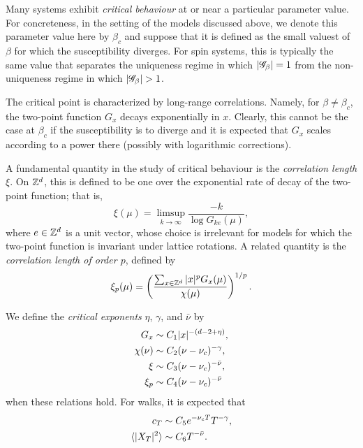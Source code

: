 Many systems exhibit \emph{critical behaviour} at or near a particular parameter value. For concreteness, in the setting of the models discussed above, we denote this parameter value here by $\beta_c$ and suppose that it is defined as the small valuest of $\beta$ for which the susceptibility diverges. For spin systems, this is typically the same value that separates the uniqueness regime in which $|\mathscr{G}_\beta| = 1$ from the non-uniqueness regime in which
$|\mathscr{G}_\beta| > 1$.

The critical point is characterized by long-range correlations. Namely, for
$\beta \ne \beta_c$, the two-point function $G_x$ decays exponentially in $x$. Clearly, this cannot be the case at $\beta_c$ if the susceptibility is to diverge and it is expected that $G_x$ scales according to a power there 
(possibly with logarithmic corrections).

A fundamental quantity in the study of critical behaviour is the
\emph{correlation length} $\xi$. On ${ {{\mathbb Z}}^d }$, this is defined to be one over the exponential rate of decay of the two-point function; that is,
\begin{equation}
\xi(\mu) = \limsup_{k\to\infty} \frac{-k}{\log G_{ke}(\mu)},
\end{equation}
where $e \in { {{\mathbb Z}}^d }$ is a unit vector, whose choice is irrelevant for models for which the two-point function is invariant under lattice rotations.
A related quantity is the \emph{correlation length of order $p$}, defined by
\begin{equation}
\xi_p(\mu) = \left(\frac{\sum_{x\in{ {{\mathbb Z}}^d }} |x|^p G_x(\mu)}{\chi(\mu)}\right)^{1/p}.
\end{equation}

We define the \emph{critical exponents} $\eta$, $\gamma$, and $\bar\nu$ by
\begin{align}
G_x       &\sim C_1 |x|^{-(d - 2 + \eta)}, \\
\chi(\nu) &\sim C_2 (\nu - \nu_c)^{-\gamma}, \\
\xi       &\sim C_3 (\nu - \nu_c)^{-\bar\nu}, \\
\xi_p     &\sim C_4 (\nu - \nu_c)^{-\bar\nu}
\end{align}
when these relations hold. For walks, it is expected that
\begin{align}
c_T                       &\sim C_5 e^{-\nu_c T} T^{-\gamma}, \\
\langle |X_T|^2 \rangle   &\sim C_6 T^{-\bar\nu}.
\end{align}

